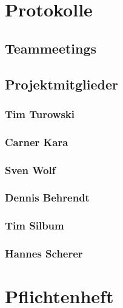 



\maketitle
\tableofcontents

\newpage
\section{Protokolle}

\subsection{Teammeetings}


\newpage
\subsection{Projektmitglieder}
\subsubsection{Tim Turowski}


\subsubsection{Carner Kara}


\subsubsection{Sven Wolf}


\subsubsection{Dennis Behrendt}


\subsubsection{Tim Silbum}


\subsubsection{Hannes Scherer}


\newpage
\section{Pflichtenheft}


